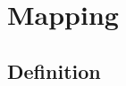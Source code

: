 \resetdatestamp

\newcommand\Dfrac[2]{\frac{\displaystyle #1}{\displaystyle #2}}
\newcommand{\mathBF}[1]{\mbox{\boldmath $#1$}}
\newcommand{\C}[1]{\mathBF{#1}}

\chapter{Mapping}

\begin{comment}
\TeX{} does a marvelous job of setting mathematical formulas, most often
 choosing pleasing spacing.
However, on occasion one should intercede to improve the layout.
This chapter defines a few such occasions.
In addition, this chapter documents some features of the {\tt amsmath}
 package which overcome difficulties in typesetting some mathematical
 forms.
The {\tt amsmath} package is documented 
 in {\it The \LaTeX{} Companion} \cite{Goossens:1997}.

The modified setup is typeset as
\begin{equation}
  G(z) = \begin{cases}
           \Dfrac {P(z)}{1+z^{-1}} & \text{for $p$ even}, \\[1ex]
           P(z)                    & \text{for $p$ odd}.
         \end{cases}
\end{equation}

With the modified definitions, we get the following.
\def\hC#1{\C{\hat{#1}}\vphantom{\C{#1}}}           %
\def\htC#1{\C{\hat{\tilde{#1}}}\vphantom{\C{#1}}}  %
\def\tC#1{\C{\tilde{#1}}\vphantom{\C{#1}}}         %
\begin{equation}
\begin{split}
  \C{d}^{(i)} &= \hC{v}^{(i)} - \htC{v}^{(i)} \\
  \C{n}^{(i)} &= \C{u}^{(i)} - \tC{v}^{(i)}
\end{split}
\end{equation}
\end{comment}

\section{Definition}

\begin{comment}
texture mapping
conceptual metaphor
function
morphism
\end{comment}


